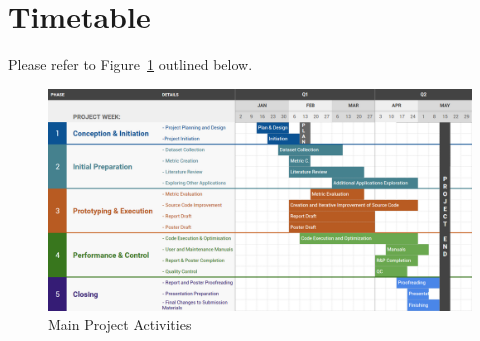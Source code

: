 \documentclass[a4paper,12pt]{article}
\begin{document}
\section*{Timetable}
Please refer to Figure~\ref{fig:plan} outlined below. 

\begin{figure}[htb]
\begin{center}
\includegraphics[width=\textwidth]{plan.png}
\caption{Main Project Activities \label{fig:plan}}
\end{center}
\end{figure}



\end{document}
